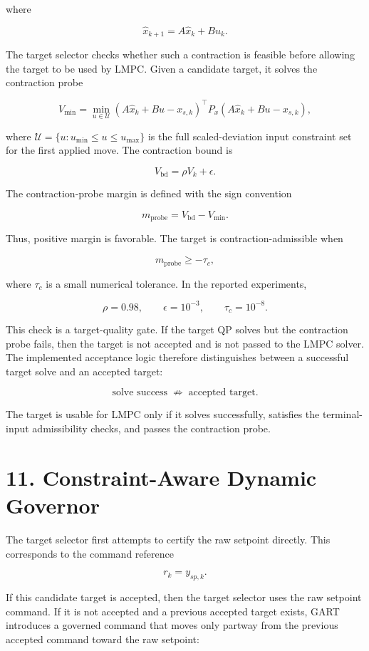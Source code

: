 \documentclass[11pt]{article}
\begin{document}
where


\[
\hat x_{k+1}=A\hat x_k+B u_k.
\]

The target selector checks whether such a contraction is feasible before allowing the target to be used by LMPC. Given a candidate target, it solves the contraction probe


\[
V_{\min}
=
\min_{u\in\mathcal U}
\left(A\hat x_k+B u-x_{s,k}\right)^\top
P_x
\left(A\hat x_k+B u-x_{s,k}\right),
\]

where $\mathcal U=\{u:u_{\min}\le u\le u_{\max}\}$ is the full scaled-deviation input constraint set for the first applied move. The contraction bound is


\[
V_{\mathrm{bd}}
=
\rho V_k+\epsilon.
\]

The contraction-probe margin is defined with the sign convention


\[
m_{\mathrm{probe}}
=
V_{\mathrm{bd}}-V_{\min}.
\]

Thus, positive margin is favorable. The target is contraction-admissible when


\[
m_{\mathrm{probe}}\ge -\tau_c,
\]

where $\tau_c$ is a small numerical tolerance. In the reported experiments,


\[
\rho=0.98,
\qquad
\epsilon=10^{-3},
\qquad
\tau_c=10^{-8}.
\]

This check is a target-quality gate. If the target QP solves but the contraction probe fails, then the target is not accepted and is not passed to the LMPC solver. The implemented acceptance logic therefore distinguishes between a successful target solve and an accepted target:


\[
\text{solve success}
\;\not\Rightarrow\;
\text{accepted target}.
\]

The target is usable for LMPC only if it solves successfully, satisfies the terminal-input admissibility checks, and passes the contraction probe.


\section*{11. Constraint-Aware Dynamic Governor}

The target selector first attempts to certify the raw setpoint directly. This corresponds to the command reference


\[
r_k=y_{sp,k}.
\]

If this candidate target is accepted, then the target selector uses the raw setpoint command. If it is not accepted and a previous accepted target exists, GART introduces a governed command that moves only partway from the previous accepted command toward the raw setpoint:
\end{document}
